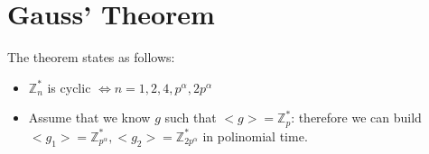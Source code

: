 \section{Gauss' Theorem}
\begin{definition}\label{gauss_theorem}
    The theorem states as follows:
    \begin{itemize}
        \item $\mathbb{Z}_{n}^{*}$ is cyclic $\iff n = 1, 2, 4, p^{\alpha}, 2p^{\alpha}$
        \item Assume that we know $g$ such that $<g> = \mathbb{Z}_{p}^{*}$:
        therefore we can build $<g_{1}> = \mathbb{Z}_{p^{\alpha}}^{*}, <g_{2}> = \mathbb{Z}_{2p^{\alpha}}^{*}$ in polinomial time.
    \end{itemize}
\end{definition}
